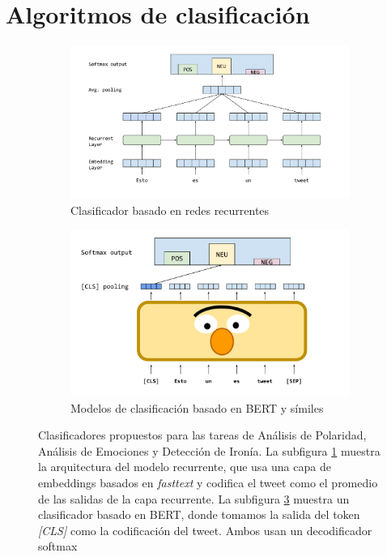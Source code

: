 \section{Algoritmos de clasificación}

\begin{figure}
    \centering
    \begin{subfigure}[t]{\textwidth}
        \centering
        \includegraphics[width=\textwidth]{img/03/recurrent_classifier.pdf}
        \caption{Clasificador basado en redes recurrentes}
        \label{subfig:rnn_classifier}
    \end{subfigure}
    \begin{subfigure}[t]{\textwidth}
        \centering
        \includegraphics[width=\textwidth]{img/03/bert_classifier.pdf}
        \caption{Modelos de clasificación basado en BERT y símiles}
        \label{subfig:bert_classifier}
    \end{subfigure}

    \caption{Clasificadores propuestos para las tareas de Análisis de Polaridad, Análisis de Emociones y Detección de Ironía. La subfigura \ref{subfig:rnn_classifier} muestra la arquitectura del modelo recurrente, que usa una capa de embeddings basados en \emph{fasttext} y codifica el tweet como el promedio de las salidas de la capa recurrente. La subfigura \ref{subfig:bert_classifier} muestra un clasificador basado en BERT, donde tomamos la salida del token \emph{[CLS]} como la codificación del tweet. Ambos usan un decodificador softmax}
\end{figure}

